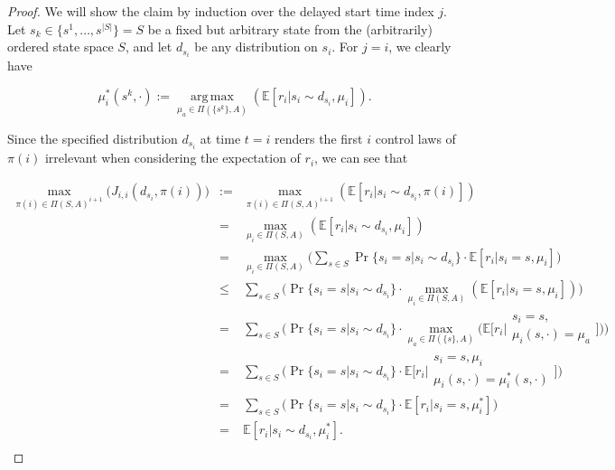 \documentclass[11pt]{article} %
\DeclareMathOperator*{\argmax}{arg\,max}
\begin{document}
\begin{proof}

We will show the claim by induction over the delayed start time index $j$. Let $s_k \in \{ s^1,\dots,s^{|S|}\} = S$ be a fixed but arbitrary state from the (arbitrarily) ordered state space $S$, and let $d_{s_i}$ be any distribution on $s_i$. For $j=i$, we clearly have

\begin{equation}
	\mu_i^*(s^k,\cdot) := \argmax\limits_{\mu_a \in \Pi(\{s^k\},A)} ( \mathbb{E}[ r_i | s_i \sim d_{s_i}, \mu_i ] ).
\end{equation}

Since the specified distribution $d_{s_i}$ at time $t = i$ renders the first $i$ control laws of $\pi(i)$ irrelevant when considering the expectation of $r_i$, we can see that

\begin{equation}
	\begin{array}{rcl}
		\max\limits_{\pi(i) \in \Pi(S,A)^{i+1}} \Big(J_{i,i}(d_{s_i},\pi(i)) \Big) & := 	& \max\limits_{\pi(i) \in \Pi(S,A)^{i+1}} ( \mathbb{E}[ r_i | s_i \sim d_{s_i}, \pi(i) ] ) \\
			& = 	& \max\limits_{\mu_i \in \Pi(S,A)} ( \mathbb{E}[ r_i | s_i \sim d_{s_i}, \mu_i ] ) \\
		 	& = 	& \max\limits_{\mu_i \in \Pi(S,A)} \Big( \sum\limits_{s \in S} \Pr\{ s_i = s | s_i \sim d_{s_i} \} \cdot \mathbb{E}[ r_i | s_i = s, \mu_i ] \Big) \\
																					& \le 	& \sum\limits_{s \in S} \Big( \Pr\{ s_i = s | s_i \sim d_{s_i} \} \cdot \max\limits_{\mu_i \in \Pi(S,A)} (\mathbb{E}[ r_i | s_i = s, \mu_i ]) \Big) \\
																					& = 	& \sum\limits_{s \in S} \Big( \Pr\{ s_i = s | s_i \sim d_{s_i} \} \cdot \max\limits_{\mu_a \in \Pi(\{s\},A)} \Big(\mathbb{E}\Big[ r_i \Big| \begin{array}{c}
																																																	s_i = s, \\
																																																	\mu_i(s,\cdot) = \mu_a
																																																\end{array} \Big] \Big) \Big) \\
																					& =		& \sum\limits_{s \in S} \Big( \Pr\{ s_i = s | s_i \sim d_{s_i} \} \cdot \mathbb{E}\Big[ r_i \Big| \begin{array}{c}
																																										s_i = s, \mu_i \\
																																										\mu_i(s,\cdot) = \mu_i^*(s,\cdot)
																																									\end{array} \Big] \Big) \\
																					& =		& \sum\limits_{s \in S} \Big( \Pr\{ s_i = s | s_i \sim d_{s_i} \} \cdot \mathbb{E}[ r_i | s_i = s, \mu_i^* ] \Big) \\
																					& =		&  \mathbb{E}[ r_i | s_i \sim d_{s_i}, \mu_i^* ]. \\
	\end{array}
\end{equation}


\end{proof}
\end{document}
